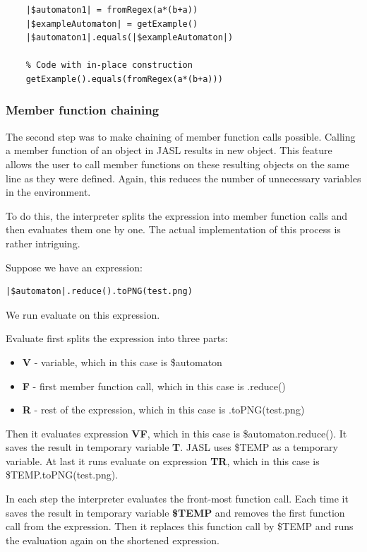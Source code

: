 \documentclass{ctuthesis}
\begin{document}
\begin{minipage}{\linewidth}
\begin{lstlisting}[language = JASL]
	% Code without in-place construction
	|$automaton1| = fromRegex(a*(b+a))
	|$exampleAutomaton| = getExample()
	|$automaton1|.equals(|$exampleAutomaton|)
	
	% Code with in-place construction
	getExample().equals(fromRegex(a*(b+a)))
\end{lstlisting}
\end{minipage}

\subsubsection{Member function chaining}
\label{chaining_impl}
The second step was to make chaining of member function calls possible. Calling a member function of an object in JASL results in new object. This feature allows the user to call member functions on these resulting objects on the same line as they were defined. Again, this reduces the number of unnecessary variables in the environment.

To do this, the interpreter splits the expression into member function calls and then evaluates them one by one. The actual implementation of this process is rather intriguing. 

Suppose we have an expression:
\begin{lstlisting}[language = JASL_snippet]
	|$automaton|.reduce().toPNG(test.png)
\end{lstlisting}
We run evaluate on this expression.

Evaluate first splits the expression into three parts:
\begin{itemize}
	\item \textbf{V} - variable, which in this case is \$automaton
	\item \textbf{F} - first member function call, which in this case is .reduce()
	\item \textbf{R} - rest of the expression, which in this case is .toPNG(test.png)
\end{itemize}

Then it evaluates expression \textbf{VF}, which in this case is \$automaton.reduce(). It saves the result in temporary variable \textbf{T}. 	
JASL uses \$TEMP as a temporary variable. At last it runs evaluate on expression \textbf{TR}, which in this case is \$TEMP.toPNG(test.png).

In each step the interpreter evaluates the front-most function call. Each time it saves the result in temporary variable \textbf{\$TEMP} and removes the first function call from the expression. Then it replaces this function call by \$TEMP and runs the evaluation again on the shortened expression. 
\end{document}
